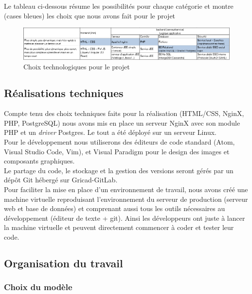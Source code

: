 \documentclass[a4paper,11pt]{article}
\begin{document}
Le tableau ci-dessous résume les possibilités pour chaque catégorie et montre (cases bleues)
les choix que nous avons fait pour le projet \\

\begin{figure}[H]
  \includegraphics[width=\linewidth]{images/choixTechno.PNG}
  \caption{Choix technologiques pour le projet}
  \label{fig:choix-techno}
\end{figure}

\subsection{Réalisations techniques}

Compte tenu des choix techniques faits pour la réalisation (HTML/CSS, NginX, PHP, PostgreSQL) nous avons
mis en place un serveur NginX avec son module PHP et un \textit{driver} Postgres. Le tout a été déployé
sur un serveur Linux.\\

Pour le développement nous utiliserons des éditeurs de code standard (Atom, Visual Studio Code, Vim), et Visual Paradigm
pour le design des images et composants graphiques.\\

Le partage du code, le stockage et la gestion des versions seront gérés par un dépôt Git hébergé sur
Gricad-GitLab.\\

Pour faciliter la mise en place d'un environnement de travail, nous avons créé une machine virtuelle
reproduisant l'environnement du serveur de production (serveur web et base de données) et comprenant
aussi tous les outils nécessaires au développement (éditeur de texte + git). Ainsi les développeurs
ont juste à lancer la machine virtuelle et peuvent directement commencer à coder et tester leur code.

\subsection{Organisation du travail}

\subsubsection{Choix du modèle}
\end{document}
